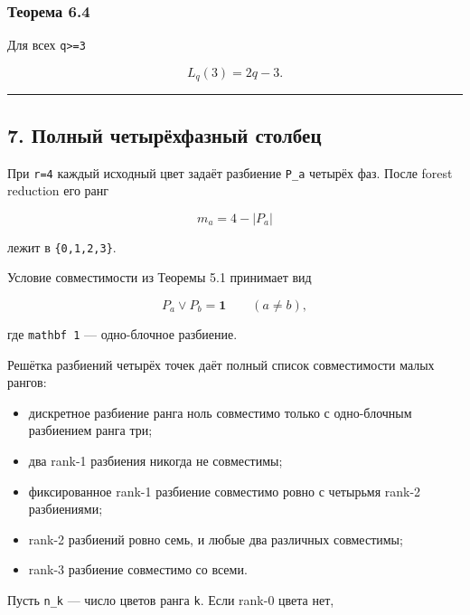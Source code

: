\hypertarget{ux442ux435ux43eux440ux435ux43cux430-6.4}{%
\subsubsection{Теорема
6.4}\label{ux442ux435ux43eux440ux435ux43cux430-6.4}}

Для всех \texttt{q\textgreater{}=3}

\[
\boxed{L_q(3)=2q-3.}
\tag{27}
\]

\begin{center}\rule{0.5\linewidth}{0.5pt}\end{center}

\hypertarget{ux43fux43eux43bux43dux44bux439-ux447ux435ux442ux44bux440ux451ux445ux444ux430ux437ux43dux44bux439-ux441ux442ux43eux43bux431ux435ux446}{%
\subsection{7. Полный четырёхфазный
столбец}\label{ux43fux43eux43bux43dux44bux439-ux447ux435ux442ux44bux440ux451ux445ux444ux430ux437ux43dux44bux439-ux441ux442ux43eux43bux431ux435ux446}}

При \texttt{r=4} каждый исходный цвет задаёт разбиение \texttt{P\_a}
четырёх фаз. После forest reduction его ранг

\[
m_a=4-|P_a|
\]

лежит в \texttt{\{0,1,2,3\}}.

Условие совместимости из Теоремы 5.1 принимает вид

\[
P_a\vee P_b=\mathbf 1
\qquad(a\ne b),
\tag{28}
\]

где \texttt{mathbf\ 1} --- одно-блочное разбиение.

Решётка разбиений четырёх точек даёт полный список совместимости малых
рангов:

\begin{itemize}
\tightlist
\item
  дискретное разбиение ранга ноль совместимо только с одно-блочным
  разбиением ранга три;
\item
  два rank-1 разбиения никогда не совместимы;
\item
  фиксированное rank-1 разбиение совместимо ровно с четырьмя rank-2
  разбиениями;
\item
  rank-2 разбиений ровно семь, и любые два различных совместимы;
\item
  rank-3 разбиение совместимо со всеми.
\end{itemize}

Пусть \texttt{n\_k} --- число цветов ранга \texttt{k}. Если rank-0 цвета
нет,

